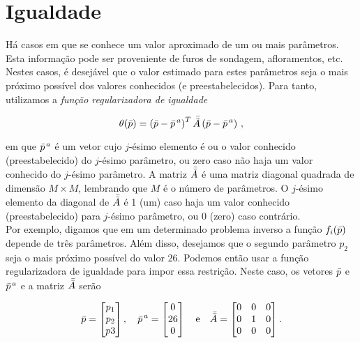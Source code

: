 \section{Igualdade}

Há casos em que se conhece um valor aproximado de um ou mais parâmetros.
Esta informação pode ser proveniente de furos de sondagem, afloramentos, etc.
Nestes casos, é desejável que o valor estimado para estes parâmetros seja o mais
próximo possível dos valores conhecidos (e preestabelecidos).
Para tanto, utilizamos a {\it função regularizadora de igualdade}

\begin{equation}
\theta(\bar{p}) =
    \left(\bar{p} - \bar{p}^{\thinspace a}\right)^T \bar{\bar{A}}
        \left(\bar{p} - \bar{p}^{\thinspace a} \right)
    \thinspace ,
\label{eq:igualdade}
\end{equation}

\noindent em que $\bar{p}^{\thinspace a}$ é um vetor cujo $j$-ésimo elemento é
ou o valor conhecido (preestabelecido) do $j$-ésimo parâmetro, ou zero caso não
haja um valor conhecido do $j$-ésimo parâmetro. A matriz $\bar{\bar{A}}$ é uma matriz
diagonal quadrada de dimensão $M \times M$, lembrando que $M$ é o número de
parâmetros.
O $j$-ésimo elemento da diagonal de $\bar{\bar{A}}$ é 1 (um) caso
haja um valor conhecido (preestabelecido) para $j$-ésimo parâmetro, ou 0 (zero)
caso contrário.
\\
\indent Por exemplo, digamos que em um determinado problema inverso a função
$f_i(\bar{p})$ depende de três parâmetros. Além disso, desejamos que o segundo
parâmetro $p_2$ seja o mais próximo possível do valor $26$.
Podemos então usar a função regularizadora de igualdade para impor essa restrição.
Neste caso, os vetores $\bar{p}$ e $\bar{p}^{\thinspace a}$ e a matriz
$\bar{\bar{A}}$ serão

\[
\bar{p} =
    \begin{bmatrix}
    p_1 \\ p_2 \\ p3
    \end{bmatrix} , \quad
\bar{p}^{\thinspace a} =
    \begin{bmatrix}
    0 \\ 26 \\ 0
    \end{bmatrix} \quad \text{e} \quad
\bar{\bar{A}} = 
    \begin{bmatrix}
    0 & 0 & 0 \\
    0 & 1 & 0 \\
    0 & 0 & 0
    \end{bmatrix} .
\]


